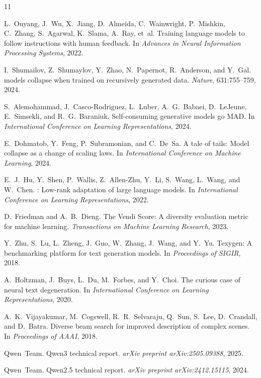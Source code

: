 \documentclass[11pt,a4paper]{article}
\begin{document}
\begin{thebibliography}{11}

L.~Ouyang, J.~Wu, X.~Jiang, D.~Almeida, C.~Wainwright, P.~Mishkin, C.~Zhang, S.~Agarwal, K.~Slama, A.~Ray, et~al.
\newblock Training language models to follow instructions with human feedback.
\newblock In \textit{Advances in Neural Information Processing Systems}, 2022.

I.~Shumailov, Z.~Shumaylov, Y.~Zhao, N.~Papernot, R.~Anderson, and Y.~Gal.
 models collapse when trained on recursively generated data.
\newblock \textit{Nature}, 631:755--759, 2024.

S.~Alemohammad, J.~Casco-Rodriguez, L.~Luber, A.~G.~Babaei, D.~LeJeune, E.~Simsekli, and R.~G.~Baraniuk.
\newblock Self-consuming generative models go {MAD}.
\newblock In \textit{International Conference on Learning Representations}, 2024.

E.~Dohmatob, Y.~Feng, P.~Subramonian, and C.~De~Sa.
\newblock A tale of tails: Model collapse as a change of scaling laws.
\newblock In \textit{International Conference on Machine Learning}, 2024.

E.~J.~Hu, Y.~Shen, P.~Wallis, Z.~Allen-Zhu, Y.~Li, S.~Wang, L.~Wang, and W.~Chen.
: Low-rank adaptation of large language models.
\newblock In \textit{International Conference on Learning Representations}, 2022.

D.~Friedman and A.~B.~Dieng.
\newblock The {V}endi {S}core: A diversity evaluation metric for machine learning.
\newblock \textit{Transactions on Machine Learning Research}, 2023.

Y.~Zhu, S.~Lu, L.~Zheng, J.~Guo, W.~Zhang, J.~Wang, and Y.~Yu.
\newblock Texygen: A benchmarking platform for text generation models.
\newblock In \textit{Proceedings of SIGIR}, 2018.

A.~Holtzman, J.~Buys, L.~Du, M.~Forbes, and Y.~Choi.
\newblock The curious case of neural text degeneration.
\newblock In \textit{International Conference on Learning Representations}, 2020.

A.~K.~Vijayakumar, M.~Cogswell, R.~R.~Selvaraju, Q.~Sun, S.~Lee, D.~Crandall, and D.~Batra.
\newblock Diverse beam search for improved description of complex scenes.
\newblock In \textit{Proceedings of AAAI}, 2018.

Qwen~Team.
\newblock Qwen3 technical report.
\newblock \textit{arXiv preprint arXiv:2505.09388}, 2025.

Qwen~Team.
\newblock Qwen2.5 technical report.
\newblock \textit{arXiv preprint arXiv:2412.15115}, 2024.

\end{thebibliography}
\end{document}
